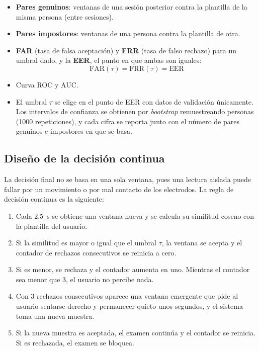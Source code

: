 \begin{itemize}
  \item \textbf{Pares genuinos}: ventanas de una sesión posterior contra la plantilla de la misma persona (entre sesiones).
  \item \textbf{Pares impostores}: ventanas de una persona contra la plantilla de otra.
  \item \textbf{FAR} (tasa de falsa aceptación) y \textbf{FRR} (tasa de falso rechazo) para un umbral dado, y la \textbf{EER}, el punto en que ambas son iguales:
  \begin{equation}
    \mathrm{FAR}(\tau) = \mathrm{FRR}(\tau) = \mathrm{EER}
  \end{equation}
  \item Curva ROC y AUC.
  \item El umbral $\tau$ se elige en el punto de EER con datos de validación únicamente. Los intervalos de confianza se obtienen por \emph{bootstrap} remuestreando personas (1000 repeticiones), y cada cifra se reporta junto con el número de pares genuinos e impostores en que se basa.
\end{itemize}

\subsection{Diseño de la decisión continua}
\label{sec:decision}

La decisión final no se basa en una sola ventana, pues una lectura aislada puede fallar por un movimiento o por mal contacto de los electrodos. La regla de decisión continua es la siguiente:

\begin{enumerate}
  \item Cada 2.5~s se obtiene una ventana nueva y se calcula su similitud coseno con la plantilla del usuario.
  \item Si la similitud es mayor o igual que el umbral $\tau$, la ventana se acepta y el contador de rechazos consecutivos se reinicia a cero.
  \item Si es menor, se rechaza y el contador aumenta en uno. Mientras el contador sea menor que 3, el usuario no percibe nada.
  \item Con 3 rechazos consecutivos aparece una ventana emergente que pide al usuario sentarse derecho y permanecer quieto unos segundos, y el sistema toma una nueva muestra.
  \item Si la nueva muestra es aceptada, el examen continúa y el contador se reinicia. Si es rechazada, el examen se bloquea.
\end{enumerate}

